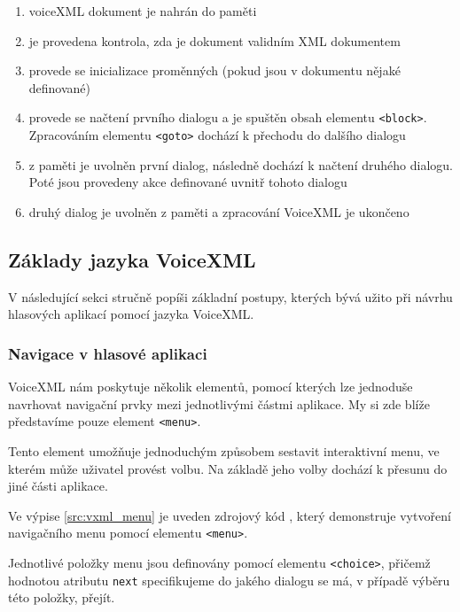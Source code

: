 \documentclass[ing,male,java,dept460,twoside]{diploma}						%
\begin{document}
\begin{enumerate}
\item voiceXML dokument je nahrán do paměti
\item je provedena kontrola, zda je dokument validním XML dokumentem
\item provede se inicializace proměnných (pokud jsou v dokumentu nějaké definované)
\item provede se načtení prvního dialogu a je spuštěn obsah elementu \texttt{<block>}. Zpracováním elementu \texttt{<goto>} dochází k přechodu do dalšího dialogu
\item z paměti je uvolněn první dialog, následně dochází k načtení druhého dialogu. Poté jsou provedeny akce definované uvnitř tohoto dialogu
\item druhý dialog je uvolněn z paměti a zpracování VoiceXML je ukončeno
\end{enumerate}

\subsection{Základy jazyka VoiceXML}
\label{sec:Zaklady_vxml}
V následující sekci stručně popíši základní postupy, kterých bývá užito při návrhu hlasových aplikací pomocí jazyka VoiceXML.

\subsubsection{Navigace v hlasové aplikaci}
VoiceXML nám poskytuje několik elementů, pomocí kterých lze jednoduše navrhovat navigační prvky mezi jednotlivými částmi aplikace. My si zde blíže představíme pouze element \texttt{<menu>}.

Tento element umožňuje jednoduchým způsobem sestavit interaktivní menu, ve kterém může uživatel provést volbu. Na základě jeho volby dochází k přesunu do jiné části aplikace.

Ve výpise \ref{src:vxml_menu} je uveden zdrojový kód \cite{vxml_org}, který demonstruje vytvoření navigačního menu pomocí elementu \texttt{<menu>}.



Jednotlivé položky menu jsou definovány pomocí elementu \texttt{<choice>}, přičemž hodnotou atributu \texttt{next} specifikujeme do jakého dialogu se má, v případě výběru této položky, přejít.
\end{document}
